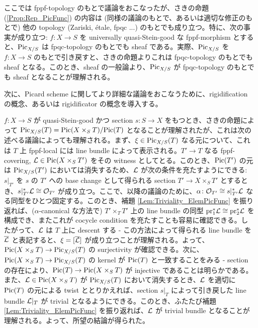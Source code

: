 \begin{note}
  ここでは fppf-topology のもとで議論をおこなったが、さきの命題 (\ref{Prop:Rep_PicFunc}) の内容は (同様の議論のもとで、あるいは適切な修正のもとで) 他の topology (Zariski, \'{e}tale, fpqc ...) のもとでも成り立つ。特に、次の事実が成り立つ: $f \colon X \to S$ を universally quasi-Stein-good な fppf-morphism とすると、$\mathrm{Pic}_{X / S}$ は fpqc-topology のもとでも sheaf である。実際、$\mathrm{Pic}_{X / S}$ を $f \colon X \to S$ のもとで引き戻すと、さきの命題よりこれは fpqc-topology のもとでも sheaf となる。このとき、sheaf の一般論より、$\mathrm{Pic}_{X / S}$ が fpqc-topology のもとでも sheaf となることが理解される。
\end{note}

次に、Picard scheme に関してより詳細な議論をおこなうために、rigidification の概念、あるいは rigidificator の概念を導入する。

$f \colon X \to S$ が quasi-Stein-good かつ section $s \colon S \to X$ をもつとき、さきの命題によって $\mathrm{Pic}_{X / S}(T) = \mathrm{Pic}(X \times_S T) / \mathrm{Pic}(T)$ となることが理解されたが、これは次の述べる議論によっても理解される。まず、$\xi \in \mathrm{Pic}_{X / S}(T)$ なる元について、これは $T$ 上 fppf-local には line bundle によって表示される。$T' \to T$ なる fppf-covering, $\mathcal{L} \in \mathrm{Pic}(X \times_S T')$ をその witness としてとる。このとき、$\mathrm{Pic}(T')$ の元は $\mathrm{Pic}_{X / S}(T')$ においては消失するため、$\mathcal{L}$ が次の条件を充たすようにできる: $s|_{T'}$ を $s$ の $T'$ への base change として得られる section $T' \to X \times_S T'$ とするとき、$s|_{T'}^*\mathcal{L} \cong \mathcal{O}_{T'}$ が成り立つ。ここで、以降の議論のために、$\alpha \colon \mathcal{O}_{T'} \cong s|_{T'}^*\mathcal{L}$ なる同型をひとつ固定する。このとき、補題 \ref{Lem:Triviality_ElemPicFunc} を振り返れば、($\alpha$-canonical な方法で) $T' \times_T T'$ 上の line bundle の同型 $\mathrm{pr}_1^*\mathcal{L} \cong \mathrm{pr}_2^*\mathcal{L}$ を構成でき、またこれが cocycle condition を充たすことも容易に確認できる。したがって、$\mathcal{L}$ は $T$ 上に descent する - この方法によって得られる line bundle を $\overline{\mathcal{L}}$ と表記すると、$\xi = [\overline{\mathcal{L}}]$ が成り立つことが理解される。よって、$\mathrm{Pic}(X \times_S T) \to \mathrm{Pic}_{X / S}(T)$ の surjectivity が確認できる。次に、$\mathrm{Pic}(X \times_S T) \to \mathrm{Pic}_{X / S}(T)$ の kernel が $\mathrm{Pic}(T)$ と一致することをみる - section の存在により、$\mathrm{Pic}(T) \to \mathrm{Pic}(X \times_S T)$ が injective であることは明らかである。また、$\mathcal{L} \in \mathrm{Pic}(X \times_S T)$ が $\mathrm{Pic}_{X / S}(T)$ において消失するとき、$\mathcal{L}$ を適切に $\mathrm{Pic}(T)$ の元による twist ととりかえれば、section $s|_{T}$ によって引き戻した line bundle $\mathcal{L}|_{T}$ が trivial となるようにできる。このとき、ふたたび補題 \ref{Lem:Triviality_ElemPicFunc} を振り返れば、$\mathcal{L}$ が trivial bundle となることが理解される。よって、所望の結論が得られた。

